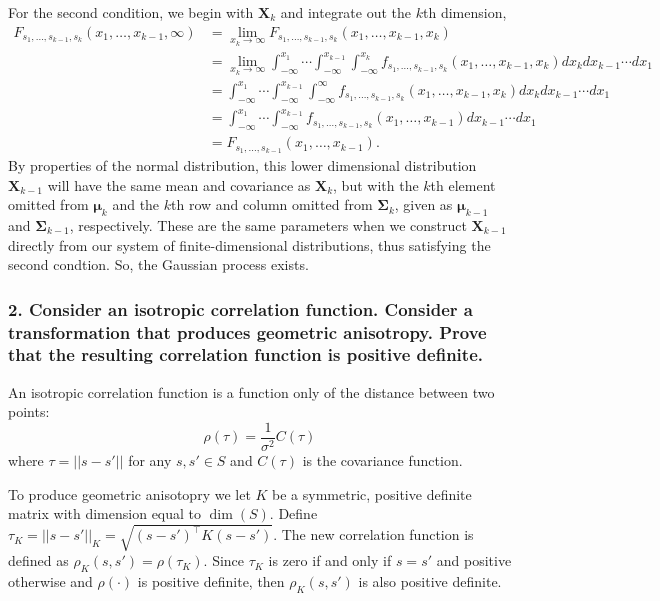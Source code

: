 \documentclass[12pt]{article}
\newcommand{\m}[1]{\mathbf{\bm{#1}}}
\begin{document}
For the second condition, we begin with $\m{X}_k$ and integrate out the $k$th dimension,
\begin{align*}
F_{s_1,\ldots,s_{k-1},s_k}(x_1,\ldots,x_{k-1},\infty) &= \lim_{x_k\rightarrow\infty} F_{s_1,\ldots,s_{k-1},s_k}(x_1,\ldots,x_{k-1},x_k) \\
&= \lim_{x_k\rightarrow\infty} \int_{-\infty}^{x_1}\cdots\int_{-\infty}^{x_{k-1}}\int_{-\infty}^{x_k}f_{s_1,\ldots,s_{k-1},s_k}(x_1,\ldots,x_{k-1},x_k)dx_kdx_{k-1}\cdots dx_1 \\
&= \int_{-\infty}^{x_1}\cdots\int_{-\infty}^{x_{k-1}}\int_{-\infty}^{\infty}f_{s_1,\ldots,s_{k-1},s_k}(x_1,\ldots,x_{k-1},x_k)dx_kdx_{k-1}\cdots dx_1 \\
&= \int_{-\infty}^{x_1}\cdots\int_{-\infty}^{x_{k-1}}f_{s_1,\ldots,s_{k-1},s_k}(x_1,\ldots,x_{k-1})dx_{k-1}\cdots dx_1 \\
&= F_{s_1,\ldots,s_{k-1}}(x_1,\ldots,x_{k-1}).
\end{align*}
By properties of the normal distribution, this lower dimensional distribution $\m{X}_{k-1}$ will have the same mean and covariance as $\m{X}_k$, but with the $k$th element omitted from $\m{\mu}_k$ and the $k$th row and column omitted from $\m{\Sigma}_k$, given as $\m{\mu}_{k-1}$ and $\m{\Sigma}_{k-1}$, respectively.  These are the same parameters when we construct $\m{X}_{k-1}$ directly from our system of finite-dimensional distributions, thus satisfying the second condtion. So, the Gaussian process exists.

\subsubsection*{2. Consider an isotropic correlation function. Consider a transformation that produces geometric anisotropy. Prove that the resulting correlation function is positive definite.}

An isotropic correlation function is a function only of the distance between two points:
\[ \rho(\tau) = \frac{1}{\sigma^2}C(\tau) \]
where $\tau=||s-s'||$ for any $s,s'\in S$ and $C(\tau)$ is the covariance function.
\bigskip

To produce geometric anisotopry we let $K$ be a symmetric, positive definite matrix with dimension equal to $\dim(S)$. Define $\tau_K=||s-s'||_K=\sqrt{(s-s')^\top K(s-s')}$. The new correlation function is defined as $\rho_K(s,s')=\rho(\tau_K)$. Since $\tau_K$ is zero if and only if $s=s'$ and positive otherwise and $\rho(\cdot)$ is positive definite, then $\rho_K(s,s')$ is also positive definite.
\end{document}
